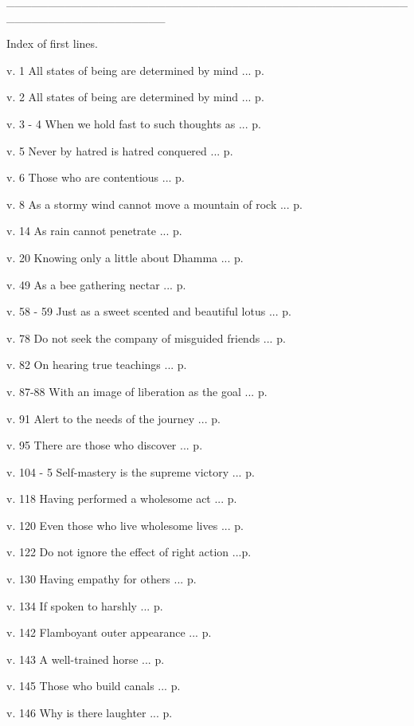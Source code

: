 \documentclass[a4paper,portrait,12pt]{article}
\begin{document}
\_\_\_\_\_\_\_\_\_\_\_\_\_\_\_\_\_\_\_\_\_\_\_\_\_\_\_\_\_\_\_\_\_\_\_\_\_\_\_\_\_\_\_\_\_\_\_\_\_\_\_\_\_\_\_\_\_\_\_\_\_\_\_\_\_\_\_





Index of first lines.








v. 1 All states of being are determined by mind ... p.


v. 2 All states of being are determined by mind ... p.


v. 3 - 4 When we hold fast to such thoughts as ... p.


v. 5 Never by hatred is hatred conquered ... p.


v. 6 Those who are contentious ... p.


v. 8 As a stormy wind cannot move a mountain of rock ... p. 


v. 14 As rain cannot penetrate ... p.


v. 20 Knowing only a little about Dhamma ... p.


v. 49 As a bee gathering nectar ... p.


v. 58 - 59 Just as a sweet scented and beautiful lotus ... p.


v. 78 Do not seek the company of misguided friends ... p.


v. 82 On hearing true teachings ... p.


v. 87-88 With an image of liberation as the goal ... p.


v. 91 Alert to the needs of the journey ... p.


v. 95 There are those who discover ... p.


v. 104 - 5 Self-mastery is the supreme victory ... p.


v. 118 Having performed a wholesome act ... p.


v. 120 Even those who live wholesome lives ... p.


v. 122 Do not ignore the effect of right action ...p.


v. 130 Having empathy for others ... p.


v. 134 If spoken to harshly ... p.


v. 142 Flamboyant outer appearance ... p. 


v. 143 A well-trained horse ... p.


v. 145 Those who build canals ... p.


v. 146 Why is there laughter ... p.
\end{document}
